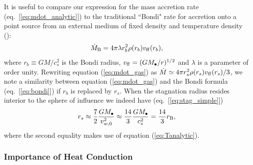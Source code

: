 \documentclass[usenatbib,fleqn]{mn2e}
\newcommand{\rs}{r_s}
\newcommand{\rb}{r_b}
\newcommand{\Mbh}[1][]{M_{\bullet#1}}
\newcommand{\vwO}{v_{w,0}}
\newcommand{\tff}{t_{\rm ff}}
\begin{document}

It is useful to compare our expression for the mass accretion rate (eq.~[\ref{eq:mdot_analytic}]) to the traditional ``Bondi" rate for accretion onto a point source from an external medium of fixed density and temperature density (\citealt{Bondi52}):
\begin{align}
  \dot{M}_{\rm B} =4\pi \lambda r_b^2 \rho(r_b) v_{\rm ff}(r_b),
\label{eq:bondi}
\end{align}
where $r_b \equiv GM/c_{s}^{2}$ is the Bondi radius, $v_{\rm ff} = (GM_{\bullet}/r)^{1/2}$ and $\lambda$ is a parameter of order unity.  Rewriting equation (\ref{eq:mdot_gas}) as $\dot{M}\simeq 4\pi \rs^2 \rho(\rs) v_{\rm ff}(\rs)/3$,
we note a similarity between equation (\ref{eq:mdot_gas}) and the Bondi formula (eq.~[\ref{eq:bondi}]) if $\rb$ is replaced by $\rs$.  When the stagnation radius resides interior to the sphere of influence we indeed have (eq.~[\ref{eq:stag_simple}])
\begin{align}
  \rs\approx\frac{7}{2}\frac{G \Mbh}{\vwO^2} \approx \frac{14}{3}\frac{GM_{\bullet}}{c_{s}^{2}} = \frac{14}{3}r_{\rm B},
  \label{eq:rs_simple}
\end{align}
where the second equality makes use of equation (\ref{eq:Tanalytic}). 

\subsubsection{Importance of Heat Conduction}
\end{document}
